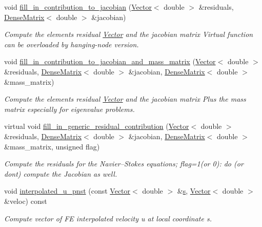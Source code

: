 \begin{DoxyCompactItemize}
void \hyperlink{classoomph_1_1PolarNavierStokesEquations_a2724cc076b394e59305ed1f7610dfa4f}{fill\+\_\+in\+\_\+contribution\+\_\+to\+\_\+jacobian} (\hyperlink{classoomph_1_1Vector}{Vector}$<$ double $>$ \&residuals, \hyperlink{classoomph_1_1DenseMatrix}{Dense\+Matrix}$<$ double $>$ \&jacobian)
\begin{DoxyCompactList}\small\item\em Compute the element\textquotesingle{}s residual \hyperlink{classoomph_1_1Vector}{Vector} and the jacobian matrix Virtual function can be overloaded by hanging-\/node version. \end{DoxyCompactList}\item 
void \hyperlink{classoomph_1_1PolarNavierStokesEquations_ae4962724a42bb1f6ccdc080bef2c69a1}{fill\+\_\+in\+\_\+contribution\+\_\+to\+\_\+jacobian\+\_\+and\+\_\+mass\+\_\+matrix} (\hyperlink{classoomph_1_1Vector}{Vector}$<$ double $>$ \&residuals, \hyperlink{classoomph_1_1DenseMatrix}{Dense\+Matrix}$<$ double $>$ \&jacobian, \hyperlink{classoomph_1_1DenseMatrix}{Dense\+Matrix}$<$ double $>$ \&mass\+\_\+matrix)
\begin{DoxyCompactList}\small\item\em Compute the element\textquotesingle{}s residual \hyperlink{classoomph_1_1Vector}{Vector} and the jacobian matrix Plus the mass matrix especially for eigenvalue problems. \end{DoxyCompactList}\item 
virtual void \hyperlink{classoomph_1_1PolarNavierStokesEquations_ad0188bfed5fc5e929017226cde427839}{fill\+\_\+in\+\_\+generic\+\_\+residual\+\_\+contribution} (\hyperlink{classoomph_1_1Vector}{Vector}$<$ double $>$ \&residuals, \hyperlink{classoomph_1_1DenseMatrix}{Dense\+Matrix}$<$ double $>$ \&jacobian, \hyperlink{classoomph_1_1DenseMatrix}{Dense\+Matrix}$<$ double $>$ \&mass\+\_\+matrix, unsigned flag)
\begin{DoxyCompactList}\small\item\em Compute the residuals for the Navier--Stokes equations; flag=1(or 0)\+: do (or don\textquotesingle{}t) compute the Jacobian as well. \end{DoxyCompactList}\item 
void \hyperlink{classoomph_1_1PolarNavierStokesEquations_ac3a3e89734b01c9f117520eac5a2ace3}{interpolated\+\_\+u\+\_\+pnst} (const \hyperlink{classoomph_1_1Vector}{Vector}$<$ double $>$ \&\hyperlink{cfortran_8h_ab7123126e4885ef647dd9c6e3807a21c}{s}, \hyperlink{classoomph_1_1Vector}{Vector}$<$ double $>$ \&veloc) const
\begin{DoxyCompactList}\small\item\em Compute vector of FE interpolated velocity u at local coordinate s. \end{DoxyCompactList}\item 

\end{DoxyCompactItemize}
